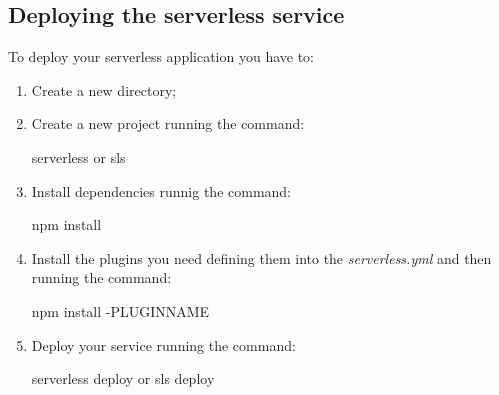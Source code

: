 \subsection{Deploying the serverless service}
To deploy your serverless application you have to:
\begin{enumerate}
	\item Create a new directory;
	\item Create a new project running the command: \begin{ttfamily}serverless or sls\end{ttfamily}
	\item Install dependencies runnig the command: 
	\begin{ttfamily}npm install\end{ttfamily}
	\item Install the plugins you need defining them into the \emph{serverless.yml} and then running the command: 
	\begin{ttfamily}npm install -PLUGINNAME\end{ttfamily}
	\item Deploy your service running the command: 
	\begin{ttfamily}serverless deploy or sls deploy\end{ttfamily}
\end{enumerate}
